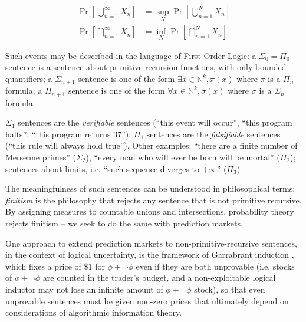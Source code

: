 \documentclass{article}
\begin{document}
\begin{align*}
    \operatorname{Pr}\left[\bigcup_{n=1}^\infty X_n\right] &=
    \sup_N \operatorname{Pr}\left[\bigcup_{n=1}^N X_n\right] \\
    \operatorname{Pr}\left[\bigcap_{n=1}^\infty X_n\right] &=
    \inf_N \operatorname{Pr}\left[\bigcap_{n=1}^N X_n\right] 
\end{align*}

Such events may be described in the language of First-Order Logic: a $\Sigma_0=\Pi_0$ sentence is a sentence about primitive recursion functions, with only bounded quantifiers; a $\Sigma_{n+1}$ sentence is one of the form $\exists x\in\mathbb{N}^k, \pi(x)$ where $\pi$ is a $\Pi_n$ formula; a $\Pi_{n+1}$ sentence is one of the form $\forall x\in\mathbb{N}^k, \sigma(x)$ where $\sigma$ is a $\Sigma_n$ formula. 

\begin{example}
    $\Sigma_1$ sentences are the \emph{verifiable} sentences (``this event will occur'', ``this program halts'', ``this program returns 37''); $\Pi_1$ sentences are the \emph{falsifiable} sentences (``this rule will always hold true''). Other examples: ``there are a finite number of Mersenne primes''  ($\Sigma_2$), ``every man who will ever be born will be mortal'' ($\Pi_2$); sentences about limits, i.e. ``such sequence diverges to $+\infty$'' ($\Pi_3$)
\end{example}

\begin{remark}
    The meaningfulness of such sentences can be understood in philosophical terms: \emph{finitism} is the philosophy that rejects any sentence that is not primitive recursive. By assigning measures to countable unions and intersections, probability theory rejects finitism -- we seek to do the same with prediction markets.
\end{remark}

One approach to extend prediction markets to non-primitive-recursive sentences, in the context of logical uncertainty, is the framework of Garrabrant induction \cite{garrabrant_logical_2016}, which fixes a price of \$1 for $\phi+\lnot\phi$ even if they are both unprovable (i.e. stocks of $\phi+\lnot\phi$ are counted in the trader's budget, and a non-exploitable logical inductor may not lose an infinite amount of $\phi+\lnot\phi$ stock), so that even unprovable sentences must be given non-zero prices that ultimately depend on considerations of algorithmic information theory. 
\end{document}
